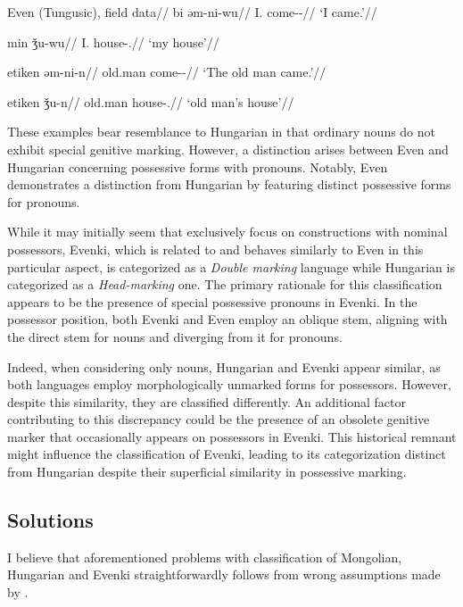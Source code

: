 \pex
\glpreamble Even (Tungusic), field data//
\a
\begingl
\gla bi əm-ni-wu//
\glb I.\Nom{} come-\Pst-\Fsg//
\glft `I came.'//
\endgl

\a
\begingl
\gla min ǯu-wu//
\glb I.\Obl{} house-\Poss.\Fsg//
\glft `my house'//
\endgl

\a
\begingl
\gla etiken əm-ni-n//
\glb old.man come-\Pst-\Tsg//
\glft `The old man came.'//
\endgl

\a
\begingl
\gla etiken ǯu-n//
\glb old.man house-\Poss.\Tsg//
\glft `old man's house'//
\endgl
\xe

These examples bear resemblance to Hungarian in that ordinary nouns do not exhibit special genitive marking. However, a distinction arises between Even and Hungarian concerning possessive forms with pronouns. Notably, Even demonstrates a distinction from Hungarian by featuring distinct possessive forms for pronouns.

While it may initially seem that \cite{nichols_locus_2013} exclusively focus on constructions with nominal possessors, Evenki, which is related to and behaves similarly to Even in this particular aspect, is categorized as a \textit{Double marking} language while Hungarian is categorized as a \textit{Head-marking} one. The primary rationale for this classification appears to be the presence of special possessive pronouns in Evenki. In the possessor position, both Evenki and Even employ an oblique stem, aligning with the direct stem for nouns and diverging from it for pronouns.

Indeed, when considering only nouns, Hungarian and Evenki appear similar, as both languages employ morphologically unmarked forms for possessors. However, despite this similarity, they are classified differently. An additional factor contributing to this discrepancy could be the presence of an obsolete genitive marker that occasionally appears on possessors in Evenki. This historical remnant might influence the classification of Evenki, leading to its categorization distinct from Hungarian despite their superficial similarity in possessive marking.

\subsection{Solutions}

I believe that aforementioned problems with classification of Mongolian, Hungarian and Evenki straightforwardly follows from wrong assumptions made by \cite{nichols_locus_2013}.

